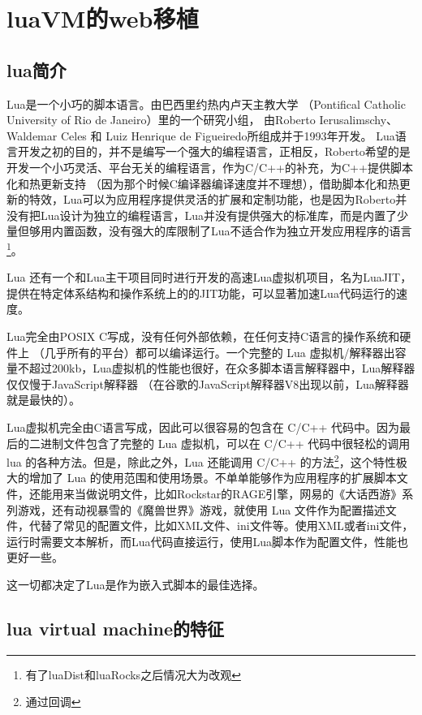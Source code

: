\chapter{luaVM的web移植}

\section{lua简介}

Lua是一个小巧的脚本语言。由巴西里约热内卢天主教大学
（Pontifical Catholic University of Rio de Janeiro）里的一个研究小组，
由Roberto Ierusalimschy、Waldemar Celes 和 Luiz Henrique de Figueiredo所组成并于1993年开发。 
Lua语言开发之初的目的，并不是编写一个强大的编程语言，正相反，Roberto希望的是开发一个小巧灵活、平台无关的编程语言，作为C/C++的补充，为C++提供脚本化和热更新支持 （因为那个时候C编译器编译速度并不理想），借助脚本化和热更新的特效，Lua可以为应用程序提供灵活的扩展和定制功能，也是因为Roberto并没有把Lua设计为独立的编程语言，Lua并没有提供强大的标准库，而是内置了少量但够用内置函数，没有强大的库限制了Lua不适合作为独立开发应用程序的语言\footnote{有了luaDist和luaRocks之后情况大为改观}。

Lua 还有一个和Lua主干项目同时进行开发的高速Lua虚拟机项目，名为LuaJIT，提供在特定体系结构和操作系统上的的JIT功能，可以显著加速Lua代码运行的速度。

Lua完全由POSIX C写成，没有任何外部依赖，在任何支持C语言的操作系统和硬件上 （几乎所有的平台）都可以编译运行。一个完整的 Lua 虚拟机/解释器出容量不超过200kb，Lua虚拟机的性能也很好，在众多脚本语言解释器中，Lua解释器仅仅慢于JavaScript解释器 （在谷歌的JavaScript解释器V8出现以前，Lua解释器就是最快的）。

Lua虚拟机完全由C语言写成，因此可以很容易的包含在 C/C++ 代码中。因为最后的二进制文件包含了完整的 Lua 虚拟机，可以在 C/C++ 代码中很轻松的调用 lua 的各种方法。但是，除此之外，Lua 还能调用 C/C++ 的方法\footnote{通过回调}，这个特性极大的增加了 Lua 的使用范围和使用场景。不单单能够作为应用程序的扩展脚本文件，还能用来当做说明文件，比如Rockstar的RAGE引擎，网易的《大话西游》系列游戏，还有动视暴雪的《魔兽世界》游戏，就使用 Lua 文件作为配置描述文件，代替了常见的配置文件，比如XML文件、ini文件等。使用XML或者ini文件，运行时需要文本解析，而Lua代码直接运行，使用Lua脚本作为配置文件，性能也更好一些。

这一切都决定了Lua是作为嵌入式脚本的最佳选择。

\section{lua virtual machine的特征}

